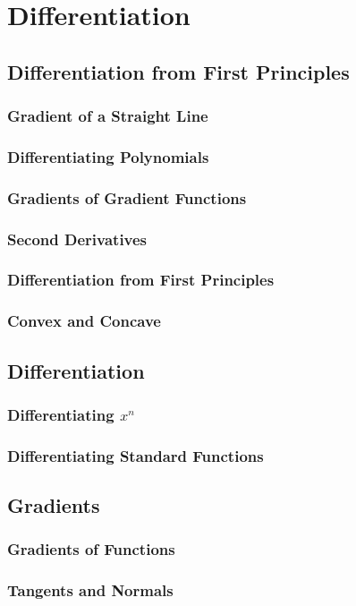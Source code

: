 \documentclass[../alevelmaths.tex]{subfiles}
\begin{document}
\chapter{Differentiation}
\section{Differentiation from First Principles}
\subsection*{Gradient of a Straight Line}
\subsection*{Differentiating Polynomials}
\subsection*{Gradients of Gradient Functions}
\subsection*{Second Derivatives}
\subsection*{Differentiation from First Principles}
\subsection*{Convex and Concave}
\section{Differentiation}
\subsection*{Differentiating \texorpdfstring{$x^n$}{x to the n}}
\subsection*{Differentiating Standard Functions}
\section{Gradients}
\subsection*{Gradients of Functions}
\subsection*{Tangents and Normals}
\end{document}
